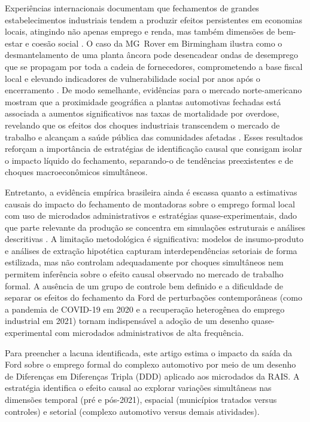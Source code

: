 \documentclass[12pt,a4paper]{article}
\begin{document}
Experi\^encias internacionais documentam que fechamentos de grandes estabelecimentos industriais tendem a produzir efeitos persistentes em economias locais, atingindo n\~ao apenas emprego e renda, mas tamb\'em dimens\~oes de bem-estar e coes\~ao social \parencite{chapain2008,beer2019,david2025,perrucci1988,venkataramani2020}. O caso da MG~Rover em Birmingham ilustra como o desmantelamento de uma planta \^ancora pode desencadear ondas de desemprego que se propagam por toda a cadeia de fornecedores, comprometendo a base fiscal local e elevando indicadores de vulnerabilidade social por anos ap\'os o encerramento \parencite{chapain2008}. De modo semelhante, evid\^encias para o mercado norte-americano mostram que a proximidade geogr\'afica a plantas automotivas fechadas est\'a associada a aumentos significativos nas taxas de mortalidade por overdose, revelando que os efeitos dos choques industriais transcendem o mercado de trabalho e alcan\c{c}am a sa\'ude p\'ublica das comunidades afetadas \parencite{venkataramani2020}. Esses resultados refor\c{c}am a import\^ancia de estrat\'egias de identifica\c{c}\~ao causal que consigam isolar o impacto l\'iquido do fechamento, separando-o de tend\^encias preexistentes e de choques macroecon\^omicos simult\^aneos.

Entretanto, a evid\^encia emp\'irica brasileira ainda \'e escassa quanto a estimativas causais do impacto do fechamento de montadoras sobre o emprego formal local com uso de microdados administrativos e estrat\'egias quase-experimentais, dado que parte relevante da produ\c{c}\~ao se concentra em simula\c{c}\~oes estruturais e an\'alises descritivas \parencite{domingues2020,dulci2021,fernandes2021}. A limita\c{c}\~ao metodol\'ogica \'e significativa: modelos de insumo-produto e an\'alises de extra\c{c}\~ao hipot\'etica capturam interdepend\^encias setoriais de forma estilizada, mas n\~ao controlam adequadamente por choques simult\^aneos nem permitem infer\^encia sobre o efeito causal observado no mercado de trabalho formal. A aus\^encia de um grupo de controle bem definido e a dificuldade de separar os efeitos do fechamento da Ford de perturba\c{c}\~oes contempor\^aneas (como a pandemia de COVID-19 em 2020 e a recupera\c{c}\~ao heterog\^enea do emprego industrial em 2021) tornam indispens\'avel a ado\c{c}\~ao de um desenho quase-experimental com microdados administrativos de alta frequ\^encia.

Para preencher a lacuna identificada, este artigo estima o impacto da sa\'ida da Ford sobre o emprego formal do complexo automotivo por meio de um desenho de Diferen\c{c}as em Diferen\c{c}as Tripla (DDD) aplicado aos microdados da RAIS. A estrat\'egia identifica o efeito causal ao explorar varia\c{c}\~oes simult\^aneas nas dimens\~oes temporal (pr\'e e p\'os-2021), espacial (munic\'ipios tratados versus controles) e setorial (complexo automotivo versus demais atividades).
\end{document}

